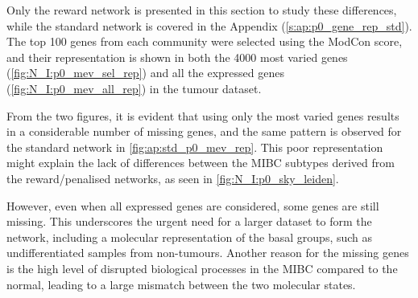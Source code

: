 Only the reward network is presented in this section to study these differences, while the standard network is covered in the Appendix (\cref{s:ap:p0_gene_rep_std}). The top 100 genes from each community were selected using the ModCon score, and their representation is shown in both the 4000 most varied genes (\cref{fig:N_I:p0_mev_sel_rep}) and all the expressed genes (\cref{fig:N_I:p0_mev_all_rep}) in the tumour dataset.

From the two figures, it is evident that using only the most varied genes results in a considerable number of missing genes, and the same pattern is observed for the standard network in \cref{fig:ap:std_p0_mev_rep}. This poor representation might explain the lack of differences between the MIBC subtypes derived from the reward/penalised networks, as seen in \cref{fig:N_I:p0_sky_leiden}.

However, even when all expressed genes are considered, some genes are still missing. This underscores the urgent need for a larger dataset to form the network, including a molecular representation of the basal groups, such as undifferentiated samples from non-tumours. Another reason for the missing genes is the high level of disrupted biological processes in the MIBC compared to the normal, leading to a large mismatch between the two molecular states.


